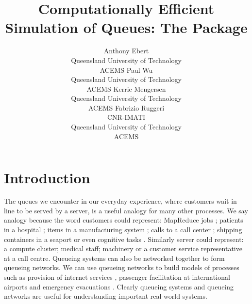 \documentclass[article]{jss}
\author{Anthony  Ebert\\Queensland University of Technology\\ACEMS \And 
        Paul Wu\\Queensland University of Technology\\ACEMS \AND
        Kerrie Mengersen\\Queensland University of Technology\\ACEMS \And
        Fabrizio Ruggeri\\CNR-IMATI\\Queensland University of Technology\\ACEMS}
\title{Computationally Efficient Simulation of Queues: The \proglang{R} Package \pkg{queuecomputer}}
\begin{document}
\section{Introduction}



The queues we encounter in our everyday experience, where customers wait in line to be served by a server, is a useful analogy for many other processes. We say analogy because the word customers could represent: MapReduce jobs \citep{lin_joint_2013}; patients in a hospital \citep{takagi_queueing_2016}; items in a manufacturing system \citep{dallery_manufacturing_1992}; calls to a call center \citep{gans_telephone_2003}; shipping containers in a seaport \citep{kozan_comparison_1997} or even cognitive tasks \citep{cao_queueing_2013}. Similarly server could represent: a compute cluster; medical staff; machinery or a customer service representative at a call centre. Queueing systems can also be networked together to form queueing networks. We can use queueing networks to build models of processes such as provision of internet services \citep{sutton_bayesian_2011}, passenger facilitation at international airports \citep{wu_review_2013} and emergency evacuations \citep{van_woensel_modeling_2007}. Clearly queueing systems and queueing networks are useful for understanding important real-world systems. 
\end{document}
